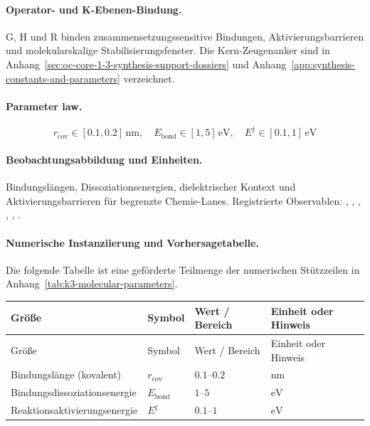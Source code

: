 \paragraph{Operator- und K-Ebenen-Bindung.}
G, H und R binden zusammensetzungssensitive Bindungen, Aktivierungsbarrieren und molekularskalige Stabilisierungsfenster.
Die Kern-Zeugenanker sind in Anhang~\ref{sec:oc-core-1-3-synthesis-support-dossiers} und Anhang~\ref{app:synthesis-constants-and-parameters} verzeichnet.

\paragraph{Parameter law.}
\[
r_{\mathrm{cov}} \in [0.1, 0.2]\,\mathrm{nm},\quad E_{\mathrm{bond}} \in [1, 5]\,\mathrm{eV},\quad E^\ddagger \in [0.1, 1]\,\mathrm{eV}
\]

\paragraph{Beobachtungsabbildung und Einheiten.}
Bindungslängen, Dissoziationsenergien, dielektrischer Kontext und Aktivierungsbarrieren für begrenzte Chemie-Lanes.
Registrierte Observablen: , \allowbreak {}, \allowbreak {}, \allowbreak {}, \allowbreak {}, \allowbreak {}.

\paragraph{Numerische Instanziierung und Vorhersagetabelle.}
Die folgende Tabelle ist eine geförderte Teilmenge der numerischen Stützzeilen in Anhang~\ref{tab:k3-molecular-parameters}.
\begin{longtable}{@{}L{0.27\textwidth}L{0.15\textwidth}L{0.24\textwidth}L{0.16\textwidth}@{}}
\toprule
Größe & Symbol & Wert / Bereich & Einheit oder Hinweis \\
\midrule
\endfirsthead
\toprule
Größe & Symbol & Wert / Bereich & Einheit oder Hinweis \\
\midrule
\endhead
Bindungslänge (kovalent) & $\scriptstyle r_{\mathrm{cov}}$ & $0.1\text{--}0.2$ & $\mathrm{nm}$ \\
Bindungsdissoziationsenergie & $\scriptstyle E_{\mathrm{bond}}$ & $1\text{--}5$ & $\mathrm{eV}$ \\
Reaktionsaktivierungsenergie & $\scriptstyle E^\ddagger$ & $0.1\text{--}1$ & $\mathrm{eV}$ \\
\bottomrule
\end{longtable}

